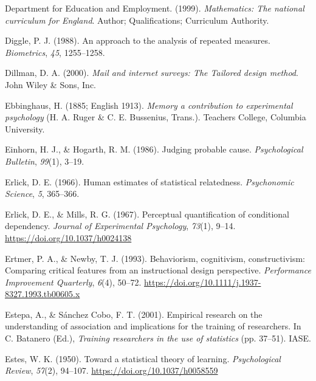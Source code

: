 \documentclass[11pt]{umnthesis}
\newlength{\cslhangindent}
\newenvironment{CSLReferences}[2] %
 {%
  \setlength{\parindent}{0pt}
  \ifodd #1 \everypar{\setlength{\hangindent}{\cslhangindent}}\ignorespaces\fi
  \ifnum #2 > 0
  \setlength{\parskip}{#2\baselineskip}
  \fi
 }%
 {}
\begin{document}
\begin{CSLReferences}{1}{0}
\leavevmode{}%
Department for Education and Employment. (1999). \emph{Mathematics: The national curriculum for {E}ngland}. Author; Qualifications; Curriculum Authority.

\leavevmode{}%
Diggle, P. J. (1988). An approach to the analysis of repeated measures. \emph{Biometrics}, \emph{45}, 1255--1258.

\leavevmode{}%
Dillman, D. A. (2000). \emph{Mail and internet surveys: The {T}ailored design method}. John Wiley \& Sons, Inc.

\leavevmode{}%
Ebbinghaus, H. (1885; English 1913). \emph{Memory a contribution to experimental psychology} (H. A. Ruger \& C. E. Bussenius, Trans.). Teachers College, Columbia University.

\leavevmode{}%
Einhorn, H. J., \& Hogarth, R. M. (1986). Judging probable cause. \emph{Psychological Bulletin}, \emph{99}(1), 3--19.

\leavevmode{}%
Erlick, D. E. (1966). Human estimates of statistical relatedness. \emph{Psychonomic Science}, \emph{5}, 365--366.

\leavevmode{}%
Erlick, D. E., \& Mills, R. G. (1967). Perceptual quantification of conditional dependency. \emph{Journal of Experimental Psychology}, \emph{73}(1), 9--14. \url{https://doi.org/10.1037/h0024138}

\leavevmode{}%
Ertmer, P. A., \& Newby, T. J. (1993). Behaviorism, cognitivism, constructivism: Comparing critical features from an instructional design perspective. \emph{Performance Improvement Quarterly}, \emph{6}(4), 50--72. \url{https://doi.org/10.1111/j.1937-8327.1993.tb00605.x}

\leavevmode{}%
Estepa, A., \& Sánchez Cobo, F. T. (2001). Empirical research on the understanding of association and implications for the training of researchers. In C. Batanero (Ed.), \emph{Training researchers in the use of statistics} (pp. 37--51). IASE.

\leavevmode{}%
Estes, W. K. (1950). Toward a statistical theory of learning. \emph{Psychological Review}, \emph{57}(2), 94--107. \url{https://doi.org/10.1037/h0058559}


\end{CSLReferences}
\end{document}
